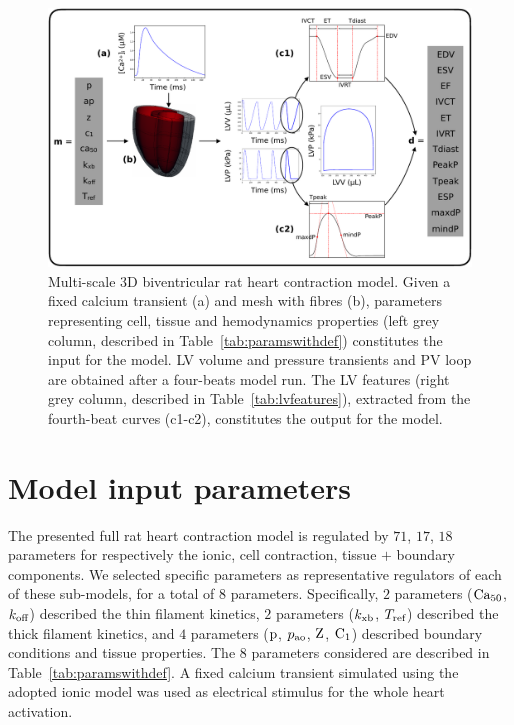 \begin{figure}[!ht]
    \myfloatalign
    \includegraphics[width=\textwidth]{figures/chapter03/simulator_framework.pdf}
    \caption{Multi-scale $3$D biventricular rat heart contraction model. Given a fixed calcium transient (a) and mesh with fibres (b), parameters representing cell, tissue and hemodynamics properties (left grey column, described in Table~\ref{tab:paramswithdef}) constitutes the input for the model. LV volume and pressure transients and PV loop are obtained after a four-beats model run. The LV features (right grey column, described in Table~\ref{tab:lvfeatures}), extracted from the fourth-beat curves (c1-c2), constitutes the output for the model. }
    \label{fig:simulatorframework}
\end{figure}


%
%
%
\section{Model input parameters}\label{sec:ch3modelinputparameters}
The presented full rat heart contraction model is regulated by $71$, $17$, $18$ parameters for respectively the ionic, cell contraction, tissue $+$ boundary components. We selected specific parameters as representative regulators of each of these sub-models, for a total of $8$ parameters. Specifically, $2$ parameters ($\textrm{Ca}_{50}$, $k_{\textrm{off}}$) described the thin filament kinetics, $2$ parameters ($k_{\textrm{xb}}$, $T_{\textrm{ref}}$) described the thick filament kinetics, and $4$ parameters ($\textrm{p}$, $p_{\textrm{ao}}$, $\textrm{Z}$, $\textrm{C}_1$) described boundary conditions and tissue properties. The $8$ parameters considered are described in Table~\ref{tab:paramswithdef}. A fixed calcium transient simulated using the adopted ionic model was used as electrical stimulus for the whole heart activation.

